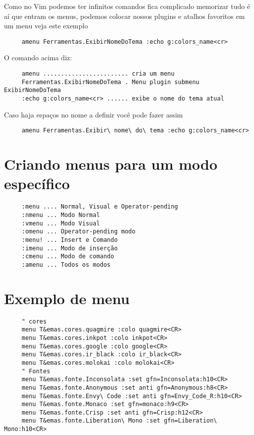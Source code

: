 Como no Vim podemos ter infinitos comandos fica complicado memorizar tudo
é aí que entram os menus, podemos colocar nossos plugins e atalhos favoritos
em um menu veja este exemplo

\begin{verbatim}
     amenu Ferramentas.ExibirNomeDoTema :echo g:colors_name<cr>
\end{verbatim}

O comando acima diz:

\begin{verbatim}
     amenu ........................ cria um menu
     Ferramentas.ExibirNomeDoTema . Menu plugin submenu ExibirNomeDoTema
     :echo g:colors_name<cr> ...... exibe o nome do tema atual
\end{verbatim}

Caso haja espaços no nome a definir você pode fazer assim

\begin{verbatim}
     amenu Ferramentas.Exibir\ nome\ do\ tema :echo g:colors_name<cr>
\end{verbatim}

\section{Criando menus para um modo específico}
\label{Criando menus para um modo específico}

\begin{verbatim}
     :menu .... Normal, Visual e Operator-pending
     :nmenu ... Modo Normal
     :vmenu ... Modo Visual
     :omenu ... Operator-pending modo
     :menu! ... Insert e Comando
     :imenu ... Modo de inserção
     :cmenu ... Modo de comando
     :amenu ... Todos os modos
\end{verbatim}

\section{Exemplo de menu}
\label{Exemplo de menu}

\begin{verbatim}
     " cores
     menu T&emas.cores.quagmire :colo quagmire<CR>
     menu T&emas.cores.inkpot :colo inkpot<CR>
     menu T&emas.cores.google :colo google<CR>
     menu T&emas.cores.ir_black :colo ir_black<CR>
     menu T&emas.cores.molokai :colo molokai<CR>
     " Fontes
     menu T&emas.fonte.Inconsolata :set gfn=Inconsolata:h10<CR>
     menu T&emas.fonte.Anonymous :set anti gfn=Anonymous:h8<CR>
     menu T&emas.fonte.Envy\ Code :set anti gfn=Envy_Code_R:h10<CR>
     menu T&emas.fonte.Monaco :set gfn=monaco:h9<CR>
     menu T&emas.fonte.Crisp :set anti gfn=Crisp:h12<CR>
     menu T&emas.fonte.Liberation\ Mono :set gfn=Liberation\ Mono:h10<CR>
\end{verbatim}

